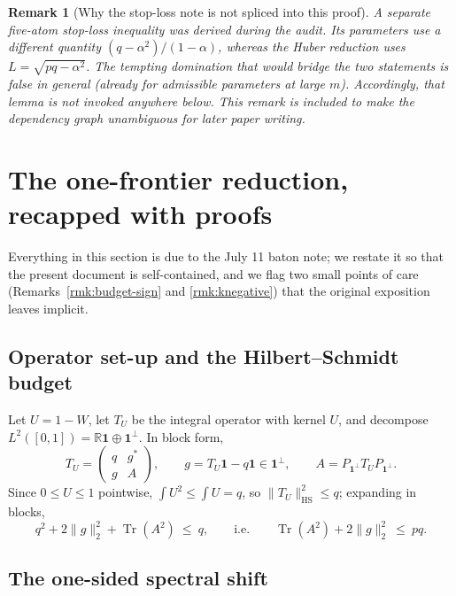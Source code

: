 \documentclass[11pt]{article}
\newtheorem{remark}[theorem]{Remark}
\newcommand{\one}{\mathbf 1}
\newcommand{\Tr}{\operatorname{Tr}}
\begin{document}
\begin{remark}[Why the stop-loss note is not spliced into this proof]
A separate five-atom stop-loss inequality was derived during the audit.  Its
parameters use a different quantity
$(q-\alpha^2)/(1-\alpha)$, whereas the Huber reduction uses
$L=\sqrt{pq-\alpha^2}$.  The tempting domination that would bridge the two
statements is false in general (already for admissible parameters at large
$m$).  Accordingly, that lemma is not invoked anywhere below.  This remark is
included to make the dependency graph unambiguous for later paper writing.
\end{remark}

\section{The one-frontier reduction, recapped with proofs}\label{sec:reduction}

Everything in this section is due to the July 11 baton note; we restate it so
that the present document is self-contained, and we flag two small points of
care (Remarks~\ref{rmk:budget-sign} and \ref{rmk:knegative}) that the original
exposition leaves implicit.

\subsection{Operator set-up and the Hilbert--Schmidt budget}

Let $U=1-W$, let $T_U$ be the integral operator with kernel $U$, and decompose
$L^2([0,1])=\mathbb R\one\oplus\one^\perp$.  In block form,
\begin{equation}\label{eq:blockTU}
        T_U=
        \begin{pmatrix}
        q&g^*\\
        g&A
        \end{pmatrix},
        \qquad
        g=T_U\one-q\one\in\one^\perp,
        \qquad
        A=P_{\one^\perp}T_UP_{\one^\perp}.
\end{equation}
Since $0\le U\le1$ pointwise, $\int U^2\le\int U=q$, so
$\|T_U\|_{\mathrm{HS}}^2\le q$; expanding in blocks,
\begin{equation}\label{eq:HS-budget}
        q^2+2\|g\|_2^2+\Tr(A^2)\ \le\ q,
        \qquad\text{i.e.}\qquad
        \Tr(A^2)+2\|g\|_2^2\ \le\ pq.
\end{equation}

\subsection{The one-sided spectral shift}
\end{document}
